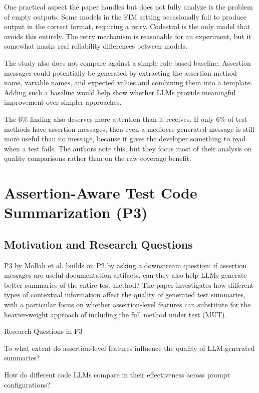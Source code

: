 \documentclass[
    pdftex,
    final,
    11pt,
    a4paper,
    parskip=false,
    oneside,
    footheight=0mm,
    footinclude=false,
    toc=bibliography
]{scrbook}
\begin{document}
One practical aspect the paper handles but does not fully analyze is the problem of empty outputs. Some models in the FIM setting occasionally fail to produce output in the correct format, requiring a retry. Codestral is the only model that avoids this entirely. The retry mechanism is reasonable for an experiment, but it somewhat masks real reliability differences between models.

The study also does not compare against a simple rule-based baseline. Assertion messages could potentially be generated by extracting the assertion method name, variable names, and expected values and combining them into a template. Adding such a baseline would help show whether LLMs provide meaningful improvement over simpler approaches.

The 6\% finding also deserves more attention than it receives. If only 6\% of test methods have assertion messages, then even a mediocre generated message is still more useful than no message, because it gives the developer something to read when a test fails. The authors note this, but they focus most of their analysis on quality comparisons rather than on the raw coverage benefit.

\section{Assertion-Aware Test Code Summarization (P3)}

\subsection{Motivation and Research Questions}

P3 by Mollah et al. \cite{Mollah2025} builds on P2 by asking a downstream question: if assertion messages are useful documentation artifacts, can they also help LLMs generate better summaries of the entire test method? The paper investigates how different types of contextual information affect the quality of generated test summaries, with a particular focus on whether assertion-level features can substitute for the heavier-weight approach of including the full method under test (MUT).

\begin{graybox}{Research Questions in P3}
\begin{description}[style=multiline, labelindent=\parindent, leftmargin=\rqindent, itemsep=-1ex]
\item[RQ1] To what extent do assertion-level features influence the quality of LLM-generated summaries?
\item[RQ2] How do different code LLMs compare in their effectiveness across prompt configurations?
\end{description}
\end{graybox}
\end{document}
